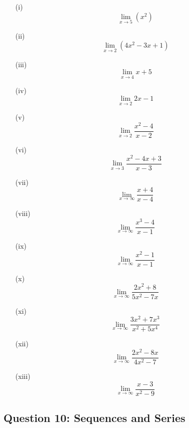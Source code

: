 \documentclass[]{article}
\begin{document}
\begin{multicols}{2}
	\begin{itemize}
		\item[(i)] \[ \lim_{x\to 5} (x^2)\]
		
		\item[(ii)] \[ \lim_{x\to 2} (4x^2 - 3x+1)\]
		
		
		\item[(iii)]\[\lim_{x \to 4 } x  + 5 \]
		\item[(iv)]\[\lim_{x \to 2 } 2x  - 1 \]
		\item[(v)]\[\lim_{x \to 2 } \frac{x^2-4}{x-2}\]
		\item[(vi)]\[\lim_{x \to 3 } \frac{x^2-4x +3}{x-3}\]
		
		\item[(vii)]\[\lim_{x \to \infty } \frac{x+4}{x-4}\]
		\item[(viii)]\[\lim_{x \to \infty } \frac{x^3-4}{x-1}\]
		\item[(ix)] \[\lim_{x \to \infty } \frac{x^2-1}{x-1} \]
		
		\item[(x)] \[ \lim_{x \to \infty} \frac{2x^2 +8}{5x^2 - 7x} \] 
		
		\item[(xi)]\[ \lim_{x \to \infty} \frac{3x^2 +7x^3}{x^2 +5x^4} \] 
		
		\item[(xii)] \[ \lim_{x \to \infty} \frac{2x^2 - 8x }{4x^2 - 7} \]
		
		
		\item[(xiii)] \[ \lim_{x \to \infty} \frac{x-3}{x^2 - 9} \]
	\end{itemize}
\end{multicols}

\newpage

\subsection*{Question 10:  Sequences and Series}
\end{document}
